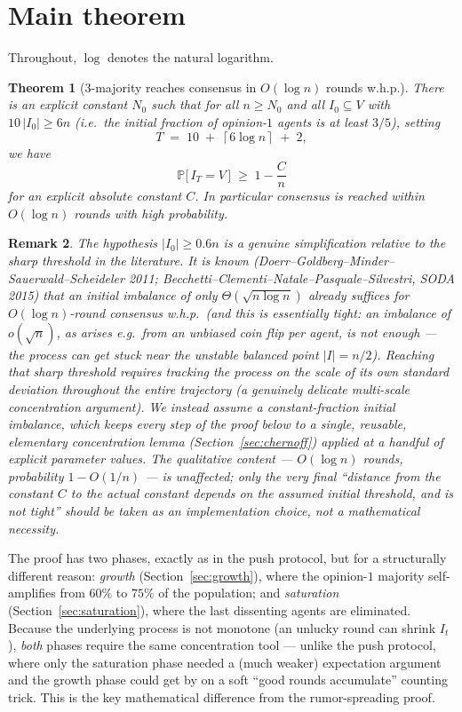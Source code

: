 \documentclass[11pt]{article}
\newtheorem{theorem}{Theorem}[section]
\newtheorem{remark}[theorem]{Remark}
\renewcommand{\Pr}{\mathbb{P}}
\newcommand{\ceil}[1]{\left\lceil #1 \right\rceil}
\begin{document}
\section{Main theorem}

Throughout, $\log$ denotes the natural logarithm.

\begin{theorem}[3-majority reaches consensus in $O(\log n)$ rounds w.h.p.]
\label{thm:main}
There is an explicit constant $N_0$ such that for all $n \ge N_0$ and all
$I_0 \subseteq V$ with $10\,|I_0| \ge 6n$ (i.e.\ the initial fraction of
opinion-$1$ agents is at least $3/5$), setting
\[
  T \;=\; 10 \;+\; \ceil{6\log n} \;+\; 2,
\]
we have
\[
  \Pr\bigl[\, I_T = V \,\bigr] \;\ge\; 1 - \frac{C}{n}
\]
for an explicit absolute constant $C$. In particular consensus is reached
within $O(\log n)$ rounds with high probability.
\end{theorem}

\begin{remark}
The hypothesis $|I_0| \ge 0.6n$ is a genuine simplification relative to the
sharp threshold in the literature. It is known (Doerr--Goldberg--Minder--
Sauerwald--Scheideler 2011; Becchetti--Clementi--Natale--Pasquale--Silvestri,
SODA 2015) that an initial imbalance of only $\Theta(\sqrt{n\log n})$ already
suffices for $O(\log n)$-round consensus w.h.p.\ (and this is essentially
tight: an imbalance of $o(\sqrt n)$, as arises e.g.\ from an unbiased coin
flip per agent, is \emph{not} enough — the process can get stuck near the
unstable balanced point $|I| = n/2$). Reaching that sharp threshold requires
tracking the process on the scale of its own standard deviation throughout
the entire trajectory (a genuinely delicate multi-scale concentration
argument). We instead assume a constant-fraction initial imbalance, which
keeps every step of the proof below to a single, reusable, elementary
concentration lemma (Section~\ref{sec:chernoff}) applied at a handful of
explicit parameter values. The qualitative content — $O(\log n)$ rounds,
probability $1-O(1/n)$ — is unaffected; only the very final ``distance from
the constant $C$ to the actual constant depends on the assumed initial
threshold, and is not tight'' should be taken as an implementation choice,
not a mathematical necessity.
\end{remark}

The proof has two phases, exactly as in the push protocol, but for a
structurally different reason: \emph{growth} (Section~\ref{sec:growth}),
where the opinion-$1$ majority self-amplifies from $60\%$ to $75\%$ of the
population; and \emph{saturation} (Section~\ref{sec:saturation}), where the
last dissenting agents are eliminated. Because the underlying process is not
monotone (an unlucky round can shrink $I_t$), \emph{both} phases require the
same concentration tool — unlike the push protocol, where only the
saturation phase needed a (much weaker) expectation argument and the growth
phase could get by on a soft ``good rounds accumulate'' counting trick. This
is the key mathematical difference from the rumor-spreading proof.
\end{document}
